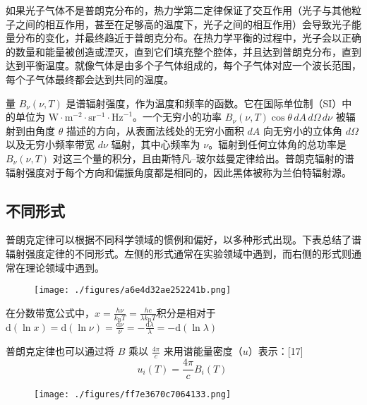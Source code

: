 如果光子气体不是普朗克分布的，热力学第二定律保证了交互作用（光子与其他粒子之间的相互作用，甚至在足够高的温度下，光子之间的相互作用）会导致光子能量分布的变化，并最终趋近于普朗克分布。在热力学平衡的过程中，光子会以正确的数量和能量被创造或湮灭，直到它们填充整个腔体，并且达到普朗克分布，直到达到平衡温度。就像气体是由多个子气体组成的，每个子气体对应一个波长范围，每个子气体最终都会达到共同的温度。

量 \( B_\nu(\nu, T) \) 是谱辐射强度，作为温度和频率的函数。它在国际单位制（SI）中的单位为 \( \text{W} \cdot \text{m}^{-2} \cdot \text{sr}^{-1} \cdot \text{Hz}^{-1} \)。一个无穷小的功率 \( B_\nu(\nu, T) \cos \theta \, dA \, d\Omega \, d\nu \) 被辐射到由角度 \( \theta \) 描述的方向，从表面法线处的无穷小面积 \( dA \) 向无穷小的立体角 \( d\Omega \) 以及无穷小频率带宽 \( d\nu \) 辐射，其中心频率为 \( \nu \)。辐射到任何立体角的总功率是 \( B_\nu(\nu, T) \) 对这三个量的积分，且由斯特凡–玻尔兹曼定律给出。普朗克辐射的谱辐射强度对于每个方向和偏振角度都是相同的，因此黑体被称为兰伯特辐射源。
\subsection{不同形式}
普朗克定律可以根据不同科学领域的惯例和偏好，以多种形式出现。下表总结了谱辐射强度定律的不同形式。左侧的形式通常在实验领域中遇到，而右侧的形式则通常在理论领域中遇到。
\begin{figure}[ht]
\centering
\texttt{[image: ./figures/a6e4d32ae252241b.png]}
\caption{} \label{fig_HTFS_3}
\end{figure}
在分数带宽公式中，\(x = \frac{h \nu}{k_{\mathrm{B}} T} = \frac{hc}{\lambda k_{\mathrm{B}} T}\)积分是相对于\(\mathrm{d} (\ln x) = \mathrm{d} (\ln \nu) = \frac{\mathrm{d} \nu}{\nu} = -\frac{\mathrm{d} \lambda}{\lambda} = -\mathrm{d} (\ln \lambda)\)

普朗克定律也可以通过将 \( B \) 乘以 \( \frac{4 \pi}{c} \) 来用谱能量密度（\( u \)）表示：[17]
\[
u_{i}(T) = \frac{4 \pi}{c} B_{i}(T)~
\]
\begin{figure}[ht]
\centering
\texttt{[image: ./figures/ff7e3670c7064133.png]}
\caption{} \label{fig_HTFS_4}
\end{figure}